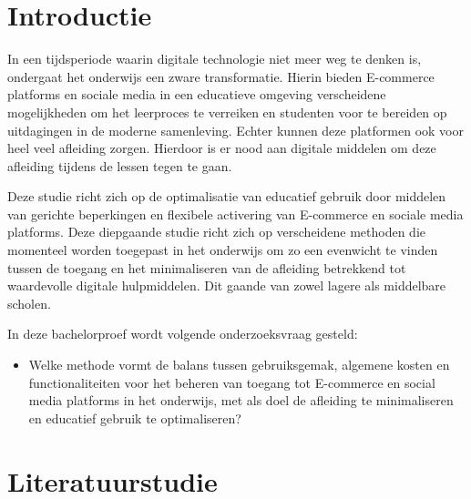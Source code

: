 
\section{Introductie}%
\label{sec:introductie}
In een tijdsperiode waarin digitale technologie niet meer weg te denken is, ondergaat het onderwijs een zware transformatie. Hierin bieden E-commerce platforms en sociale media in een educatieve omgeving verscheidene mogelijkheden om het leerproces te verreiken en studenten voor te bereiden op uitdagingen in de moderne samenleving. Echter kunnen deze platformen ook voor heel veel afleiding zorgen. Hierdoor is er nood aan digitale middelen om deze afleiding tijdens de lessen tegen te gaan. 

Deze studie richt zich op de optimalisatie van educatief gebruik door middelen van gerichte beperkingen en flexibele activering van E-commerce en sociale media platforms. Deze diepgaande studie richt zich op verscheidene methoden die momenteel worden toegepast in het onderwijs om zo een evenwicht te vinden tussen de toegang en het minimaliseren van de afleiding betrekkend tot waardevolle digitale hulpmiddelen. Dit gaande van zowel lagere als middelbare scholen. 

In deze bachelorproef wordt volgende onderzoeksvraag gesteld:
\begin{itemize}
    \item Welke methode vormt de balans tussen gebruiksgemak, algemene kosten en functionaliteiten voor het beheren van toegang tot E-commerce en social media platforms in het onderwijs, met als doel de afleiding te minimaliseren en educatief gebruik te optimaliseren? 
\end{itemize}



\section{Literatuurstudie}%
\label{sec:state-of-the-art}
